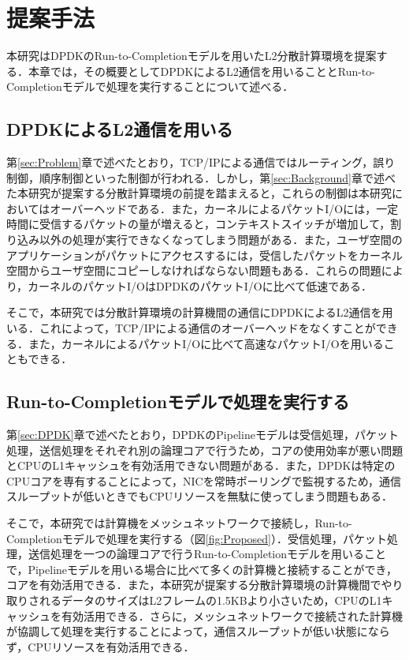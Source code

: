 \section{提案手法}
\label{sec:Proposed}
本研究はDPDKのRun-to-Completionモデルを用いたL2分散計算環境を提案する．本章では，その概要としてDPDKによるL2通信を用いることとRun-to-Completionモデルで処理を実行することについて述べる．

\subsection{DPDKによるL2通信を用いる}
第\ref{sec:Problem}章で述べたとおり，TCP/IPによる通信ではルーティング，誤り制御，順序制御といった制御が行われる．しかし，第\ref{sec:Background}章で述べた本研究が提案する分散計算環境の前提を踏まえると，これらの制御は本研究においてはオーバーヘッドである．また，カーネルによるパケットI/Oには，一定時間に受信するパケットの量が増えると，コンテキストスイッチが増加して，割り込み以外の処理が実行できなくなってしまう問題がある．また，ユーザ空間のアプリケーションがパケットにアクセスするには，受信したパケットをカーネル空間からユーザ空間にコピーしなければならない問題もある．これらの問題により，カーネルのパケットI/OはDPDKのパケットI/Oに比べて低速である．

そこで，本研究では分散計算環境の計算機間の通信にDPDKによるL2通信を用いる．これによって，TCP/IPによる通信のオーバーヘッドをなくすことができる．また，カーネルによるパケットI/Oに比べて高速なパケットI/Oを用いることもできる．

\subsection{Run-to-Completionモデルで処理を実行する}
第\ref{sec:DPDK}章で述べたとおり，DPDKのPipelineモデルは受信処理，パケット処理，送信処理をそれぞれ別の論理コアで行うため，コアの使用効率が悪い問題とCPUのL1キャッシュを有効活用できない問題がある．また，DPDKは特定のCPUコアを専有することによって，NICを常時ポーリングで監視するため，通信スループットが低いときでもCPUリソースを無駄に使ってしまう問題もある．

そこで，本研究では計算機をメッシュネットワークで接続し，Run-to-Completionモデルで処理を実行する（図\ref{fig:Proposed}）．受信処理，パケット処理，送信処理を一つの論理コアで行うRun-to-Completionモデルを用いることで，Pipelineモデルを用いる場合に比べて多くの計算機と接続することができ，コアを有効活用できる．また，本研究が提案する分散計算環境の計算機間でやり取りされるデータのサイズはL2フレームの1.5KBより小さいため，CPUのL1キャッシュを有効活用できる．さらに，メッシュネットワークで接続された計算機が協調して処理を実行することによって，通信スループットが低い状態にならず，CPUリソースを有効活用できる．


